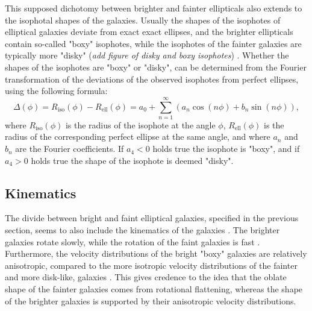 \documentclass[english, oneside]{HYgradu}
\begin{document}
This supposed dichotomy between brighter and fainter ellipticals also extends to the isophotal shapes of the galaxies. Usually the shapes of the isophotes of elliptical galaxies deviate from exact exact ellipses, and the brighter ellipticals contain so-called "boxy" isophotes, while the isophotes of the fainter galaxies are typically more "disky" (\textit{add figure of disky and boxy isophotes}) \citep{GalaxyFormationAndEvo2010}. Whether the shapes of the isophotes are "boxy" or "disky", can be determined from the Fourier transformation of the deviations of the observed isophotes from perfect ellipses, using the following formula:
\begin{equation}
\Delta (\phi) = R_\mathrm{iso}(\phi) - R_\mathrm{ell}(\phi) = a_0 + \displaystyle\sum^\infty_{n=1} (a_n \cos(n\phi) + b_n \sin(n\phi)), 
\end{equation}
where $R_\mathrm{iso}(\phi)$ is the radius of the isophote at the angle $\phi$, $R_\mathrm{ell}(\phi)$ is the radius of the corresponding perfect ellipse at the same angle, and where $a_n$ and $b_n$ are the Fourier coefficients. If $a_4 < 0$ holds true the isophote is "boxy", and if $a_4 > 0$ holds true the shape of the isophote is deemed "disky".

\subsection{Kinematics} \label{section:ellip_kinematics}

The divide between bright and faint elliptical galaxies, specified in the previous section, seems to also include the kinematics of the galaxies \citep[discussed in e.g.][]{GalaxyFormationAndEvo2010}. The brighter galaxies rotate slowly, while the rotation of the faint galaxies is fast \citep{Davies1983}. Furthermore, the velocity distributions of the bright "boxy" galaxies are relatively anisotropic, compared to the more isotropic velocity distributions of the fainter and more disk-like, galaxies \citep{Kormendy2009, Krajnovic2008}. This gives credence to the idea that the oblate shape of the fainter galaxies comes from rotational flattening, whereas the shape of the brighter galaxies is supported by their anisotropic velocity distributions.
\end{document}
